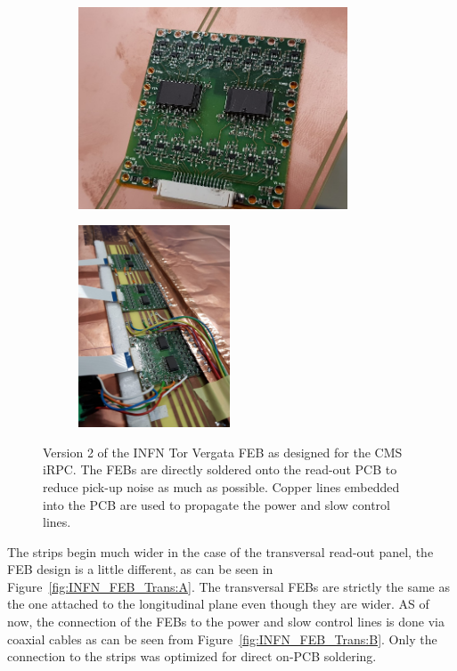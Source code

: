 	\begin{figure}[H]
		\begin{subfigure}{.6\linewidth}
		    \centering
			\includegraphics[height = 6cm]{fig/chapt6/INFN-FEB.png}
			\caption{\label{fig:INFN_FEBv2:A}}
		\end{subfigure}
		\begin{subfigure}{.4\linewidth}
		    \centering
			\includegraphics[height = 6cm]{fig/chapt6/INFN-FEB-on-readout.png}
			\caption{\label{fig:INFN_FEBv2:B}}
		\end{subfigure}
		\caption{\label{fig:INFN_FEBv2} Version 2 of the INFN Tor Vergata FEB as designed for the CMS iRPC. The FEBs are directly soldered onto the read-out PCB to reduce pick-up noise as much as possible. Copper lines embedded into the PCB are used to propagate the power and slow control lines.}
    \end{figure}
    
    The strips begin much wider in the case of the transversal read-out panel, the FEB design is a little different, as can be seen in Figure~\ref{fig:INFN_FEB_Trans:A}. The transversal FEBs are strictly the same as the one attached to the longitudinal plane even though they are wider. AS of now, the connection of the FEBs to the power and slow control lines is done via coaxial cables as can be seen from Figure~\ref{fig:INFN_FEB_Trans:B}. Only the connection to the strips was optimized for direct on-PCB soldering.
	 

